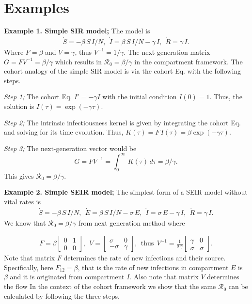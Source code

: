 \documentclass[12pt]{article}
\DeclareRobustCommand\_{\ifmmode\expandafter\subtxt\else\textunderscore\fi}
\newcommand{\R}{\ensuremath{\mathcal{R}_0}}
\theoremstyle{definition} %
\begin{document}
\section{Examples}

{\bf Example 1. Simple SIR model;}
The model is
\begin{align}\label{mo:sir}
\dot S=-\beta\,S\,I/N,~~
\dot I= \beta\,S\,I/N -\gamma\,I,~~
\dot R= \gamma\,I.
\end{align}
Where $F=\beta$ and $V=\gamma$, thus $V^{-1}=1/\gamma$. The next-generation matrix $G=FV^{-1}=\beta/\gamma$ which results in $\R=\beta/\gamma$ in the compartment framework.
The cohort analogy of the simple SIR model is via the cohort Eq. with the following steps.

{\it Step 1;} The cohort Eq. $I'=-\gamma I$ with the initial condition $I(0)=1$. Thus, the solution is $I(\tau)=\exp(-\gamma \tau)$. 

{\it Step 2;} The intrinsic infectiousness kernel is given by integrating the cohort Eq. and solving for its time evolution.  Thus, $K(\tau)=F\,I(\tau)=\beta \exp(-\gamma \tau)$.

{\it Step 3;} The next-generation vector would be 
$$G=FV^{-1}=\int_0^\infty\,K(\tau)\,d\tau=\beta/\gamma.$$ This gives $\R=\beta/\gamma$. 

\noindent
{\bf Example 2. Simple SEIR model;}
The simplest form of a SEIR model without vital rates is 
\begin{align}\label{mo:sier1}
\dot S=-\beta\,S\,I/N,~~
\dot E= \beta\,S\,I/N -\sigma\,E,~~
\dot I= \sigma\,E -\gamma\,I,~~
\dot R= \gamma\,I.
\end{align}
We know that $\R=\beta/\gamma$ from next generation method where 

\begin{align}
\label{seir1FV}
F = \beta \left[ \begin {array}{cc} 
0 & 1 \\
0 & 0
 \end {array} \right],~~
V=
 \left[ \begin {array}{cc}
 \sigma & 0 \\
-\sigma & \gamma
\end {array} \right],
~~ \text{thus}~~
V^{-1} = \frac{1}{\sigma\,\gamma}
\left[ \begin {array}{cc}
\gamma & 0 \\
\sigma & \sigma
\end {array} \right].
\end{align}
Note that matrix $F$ determines the rate of new infections and their source. Specifically, here $F_{12}=\beta$, that is the rate of new infections in compartment $E$ is $\beta$ and it is originated from compartment $I$.  Also note that matrix $V$ determines the flow   
In the context of the cohort framework we show that the same $\R$ can be calculated by following the three steps.
\end{document}
